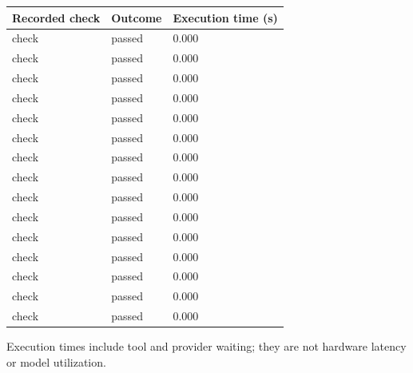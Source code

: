 \documentclass[11pt,a4paper]{article}
\begin{document}
{\small\renewcommand{\arraystretch}{1.18}\begin{longtable}{@{}L{0.57\textwidth}|L{0.16\textwidth}|L{0.17\textwidth}@{}}\toprule

\textbf{Recorded check} & \textbf{Outcome} & \textbf{Execution time (\allowbreak{}s)\allowbreak{}}\\\midrule\endhead

check & passed & 0.000\\[2pt]\hline

check & passed & 0.000\\[2pt]\hline

check & passed & 0.000\\[2pt]\hline

check & passed & 0.000\\[2pt]\hline

check & passed & 0.000\\[2pt]\hline

check & passed & 0.000\\[2pt]\hline

check & passed & 0.000\\[2pt]\hline

check & passed & 0.000\\[2pt]\hline

check & passed & 0.000\\[2pt]\hline

check & passed & 0.000\\[2pt]\hline

check & passed & 0.000\\[2pt]\hline

check & passed & 0.000\\[2pt]\hline

check & passed & 0.000\\[2pt]\hline

check & passed & 0.000\\[2pt]\hline

check & passed & 0.000\\[2pt]\hline

\bottomrule\end{longtable}}

Execution times include tool and provider waiting; they are not hardware latency or model utilization.
\end{document}
